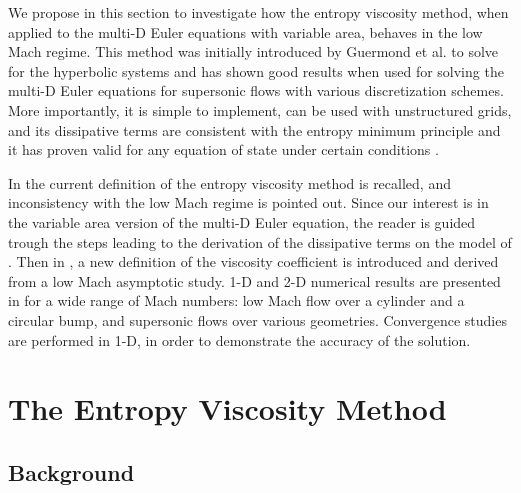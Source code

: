 We propose in this section to investigate how the entropy viscosity method, when applied to the multi-D Euler equations with variable area, behaves in the low Mach regime. This method was initially introduced by Guermond et al. to solve for the hyperbolic systems and has shown good results when used for solving the multi-D Euler equations for supersonic flows with various discretization schemes. More importantly, it is simple to implement, can be used with unstructured grids,  and its dissipative terms are consistent with the entropy minimum principle and it has proven valid for any equation of state under certain conditions \cite{jlg}.

In  the current definition of the entropy viscosity method is recalled, and inconsistency with the low Mach regime is pointed out. Since our interest is in the variable area version of the multi-D Euler equation, the reader is guided trough the steps leading to the derivation of the dissipative terms on the model of \cite{jlg}. Then in , a new definition of the viscosity coefficient is introduced and derived from a low Mach asymptotic study. 1-D and 2-D numerical results are presented in  for a wide range of Mach numbers: low Mach flow over a cylinder and a circular bump, and supersonic flows over various geometries. Convergence studies are performed in 1-D, in order to demonstrate the accuracy of the solution.

\section{The Entropy Viscosity Method} \label{sec:entro_visc}

\subsection{Background} \label{sec:background}

